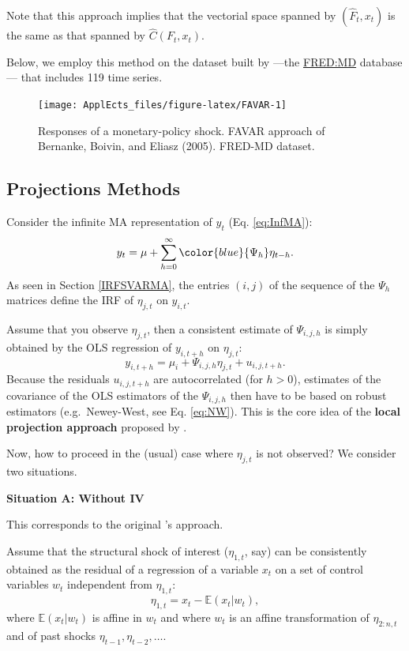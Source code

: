 \documentclass[
  12pt,
]{book}
\theoremstyle{definition}
\theoremstyle{definition}
\theoremstyle{definition}
\theoremstyle{definition}
\theoremstyle{remark}
\begin{document}
Note that this approach implies that the vectorial space spanned by \((\hat{F}_t,x_t)\) is the same as that spanned by \(\hat{C}(F_t,x_t)\).

Below, we employ this method on the dataset built by \citet{McCracken_Ng_2016} ---the \href{https://research.stlouisfed.org/wp/more/2015-012}{FRED:MD} database--- that includes 119 time series.

\begin{figure}
\texttt{[image: ApplEcts\_files/figure-latex/FAVAR-1]} \caption{Responses of a monetary-policy shock. FAVAR approach of Bernanke, Boivin, and Eliasz (2005). FRED-MD dataset.}\label{fig:FAVAR}
\end{figure}

\hypertarget{Projections}{%
\subsection{Projections Methods}\label{Projections}}

Consider the infinite MA representation of \(y_t\) (Eq. \eqref{eq:InfMA}):
\[
y_t = \mu + \sum_{h=0}^\infty \color{blue}{\Psi_{h}} \eta_{t-h}.
\]
As seen in Section \ref{IRFSVARMA}, the entries \((i,j)\) of the sequence of the \(\Psi_h\) matrices define the IRF of \(\eta_{j,t}\) on \(y_{i,t}\).

Assume that you observe \(\eta_{j,t}\), then a consistent estimate of \(\Psi_{i,j,h}\) is simply obtained by the OLS regression of \(y_{i,t+h}\) on \(\eta_{j,t}\):
\begin{equation}
y_{i,t+h} = \mu_i + \Psi_{i,j,h}\eta_{j,t} + u_{i,j,t+h}.\label{eq:OLS1}
\end{equation}
Because the residuals \(u_{i,j,t+h}\) are autocorrelated (for \(h>0\)), estimates of the covariance of the OLS estimators of the \(\Psi_{i,j,h}\) then have to be based on robust estimators (e.g.~Newey-West, see Eq. \eqref{eq:NW}). This is the core idea of the \textbf{local projection approach} proposed by \citet{Jorda_2005}.

Now, how to proceed in the (usual) case where \(\eta_{j,t}\) is not observed? We consider two situations.

\textbf{Situation A: Without IV}

This corresponds to the original \citet{Jorda_2005}'s approach.

Assume that the structural shock of interest (\(\eta_{1,t}\), say) can be consistently obtained as the residual of a regression of a variable \(x_t\) on a set of control variables \(w_t\) independent from \(\eta_{1,t}\):
\begin{equation}
\eta_{1,t} = x_t - \mathbb{E}(x_t|w_t),\label{eq:xetaw}
\end{equation}
where \(\mathbb{E}(x_t|w_t)\) is affine in \(w_t\) and where \(w_t\) is an affine transformation of \(\eta_{2:n,t}\) and of past shocks \(\eta_{t-1},\eta_{t-2},\dots\).
\end{document}
